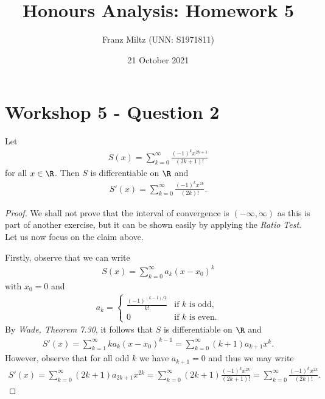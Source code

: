 \documentclass{article}
\begin{document}
\title{Honours Analysis: Homework 5}
\author{Franz Miltz (UNN: S1971811)}
\date{21 October 2021}
\maketitle

\section*{Workshop 5 - Question 2}

\begin{claim*}
   Let 
   \begin{align*}
      S(x)=\sum_{k=0}^\infty \frac{(-1)^k x^{2k+1}}{(2k+1)!}
   \end{align*}
   for all $x\in\R$. Then $S$ is differentiable on $\R$ and 
   \begin{align*}
      S'(x) = \sum_{k=0}^\infty \frac{(-1)^kx^{2k}}{(2k)!}.
   \end{align*}
\end{claim*}

\begin{proof}
   We shall not prove that the interval of convergence is $(-\infty,\infty)$
   as this is part of another exercise, but it can be shown easily by 
   applying the \emph{Ratio Test}. Let us now focus on the claim above.
   
   Firstly, observe that we can write 
   \begin{align*}
      S(x) = \sum_{k=0}^\infty a_k(x-x_0)^k
   \end{align*}
   with $x_0 = 0$ and 
   \begin{align*}
      a_k = \begin{cases}
         \frac{(-1)^{(k-1)/2}}{k!} &\text{if $k$ is odd},\\
         0 &\text{if $k$ is even}.
      \end{cases}
   \end{align*}
   By \emph{Wade, Theorem 7.30}, it follows that $S$ is differentiable on $\R$
   and 
   \begin{align*}
      S'(x) = \sum_{k=1}^\infty ka_k(x-x_0)^{k-1}
      = \sum_{k=0}^\infty (k+1)a_{k+1}x^k.
   \end{align*}
   However, observe that for all odd $k$ we have $a_{k+1}=0$
   and thus we may write 
   \begin{align*}
      S'(x) = \sum_{k=0}^\infty (2k+1)a_{2k+1}x^{2k}
      = \sum_{k=0}^\infty (2k+1)\frac{(-1)^k x^{2k}}{(2k+1)!}
      = \sum_{k=0}^\infty \frac{(-1)^k x^{2k}}{(2k)!}.
   \end{align*}
\end{proof}
\end{document}
